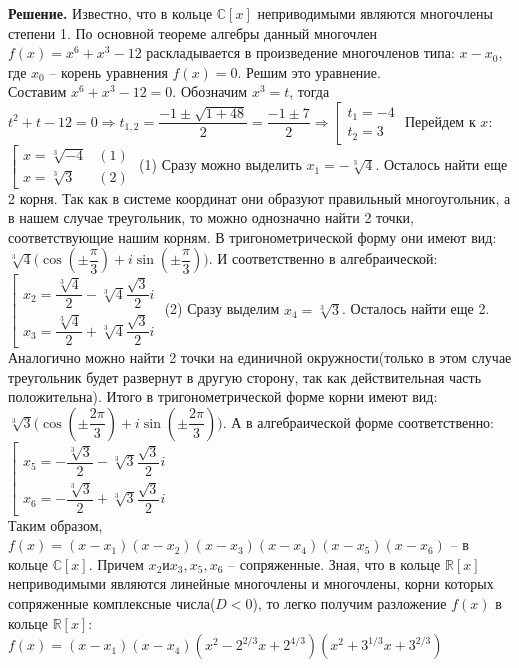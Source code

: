 \documentclass[a4paper, 12pt]{article}
\newcommand{\R}{\mathbb{R}}
\newcommand{\Co}{\mathbb{C}}
\begin{document}
\begin{spacing}{1}
\noindent \textbf{Решение.} Известно, что в кольце $\Co[x]$ неприводимыми являются многочлены степени 1. По основной теореме алгебры данный многочлен $f(x) = x^6 + x^3 - 12$ раскладывается в произведение многочленов типа: $x-x_0$, где $x_0$ -- корень уравнения $f(x) = 0$. Решим это уравнение. \\
Составим $x^6 + x^3 - 12 = 0$. Обозначим $x^3 = t$, тогда $t^2 + t - 12 = 0 \Rightarrow t_{1,2} = \dfrac{-1 \pm \sqrt{1 + 48}}{2} = \dfrac{-1 \pm 7}{2} \Rightarrow \left[\begin{array}{l|}
	t_1 = -4\\
	t_2 = 3
\end{array}\right.
$ Перейдем к $x$: $\left[\begin{array}{ll|}
	x = \sqrt[3]{-4} & (1)\\
	x = \sqrt[3]{3} & (2)
\end{array}\right.$ (1) Сразу можно выделить $x_1 = -\sqrt[3]{4}$. Осталось найти еще 2 корня. Так как в системе координат они образуют правильный многоугольник, а в нашем случае треугольник, то можно однозначно найти 2 точки, соответствующие нашим корням. В тригонометрической форму они имеют вид: $\sqrt[3]4\big(\cos(\pm\dfrac{\pi}{3})+i\sin(\pm\dfrac{\pi}{3})\big)$. И соответственно в алгебраической: $\left[\begin{array}{l|}
x_2 = \dfrac{\sqrt[3]4}{2} - \sqrt[3]4\dfrac{\sqrt3}{2}i\\[7pt]
x_3 = \dfrac{\sqrt[3]4}{2} + \sqrt[3]4\dfrac{\sqrt3}{2}i
\end{array}\right.$ (2) Сразу выделим $x_4 = \sqrt[3]{3}$. Осталось найти еще 2. Аналогично можно найти 2 точки на единичной окружности(только в этом случае треугольник будет развернут в другую сторону, так как действительная часть положительна). Итого в тригонометрической форме корни имеют вид: $\sqrt[3]3\big(\cos(\pm \dfrac{2\pi}{3}) + i\sin(\pm \dfrac{2\pi}{3})\big)$. А в алгебраической форме соответственно:$\left[\begin{array}{l}
x_5 = -\dfrac{\sqrt[3]3}{2} - \sqrt[3]3\dfrac{\sqrt3}{2}i\\[7pt]
x_6 = -\dfrac{\sqrt[3]3}{2} + \sqrt[3]3\dfrac{\sqrt3}{2}i
\end{array}\right.$ \\
Таким образом, $f(x) = (x-x_1)(x-x_2)(x-x_3)(x-x_4)(x-x_5)(x-x_6)$ -- в кольце $\Co[x]$. Причем $x_2 и x_3, x_5,x_6$ -- сопряженные. Зная, что в кольце $\R[x]$ неприводимыми являются линейные многочлены и многочлены, корни которых сопряженные комплексные числа($D < 0$), то легко получим разложение $f(x)$ в кольце $\R[x]$: $f(x) = (x - x_1)(x-x_4)(x^2 - 2^{2/3} x + 2^{4/3})(x^2 + 3^{1/3}x + 3^{2/3})$  







\end{spacing}
\end{document}
